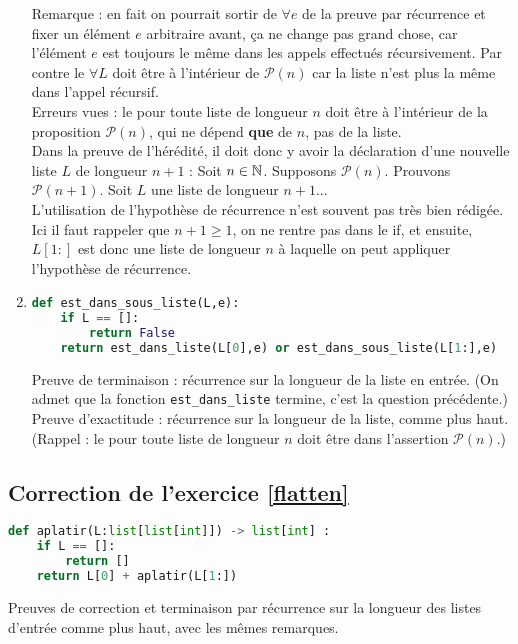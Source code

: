 \documentclass[11pt,a4paper]{article}
\begin{document}
\begin{enumerate}
Remarque : en fait on pourrait sortir de $\forall e$ de la preuve par récurrence et fixer un élément $e$ arbitraire avant, ça ne change pas grand chose, car l'élément $e$ est toujours le même dans les appels effectués récursivement. Par contre le $\forall L$ doit être à l'intérieur de $\mathcal P(n)$ car la liste n'est plus la même dans l'appel récursif.\\
Erreurs vues : le \og pour toute liste de longueur $n$\fg{} doit être à l'intérieur de la proposition $\mathcal P(n)$, qui ne dépend \textbf{que} de $n$, pas de la liste.\\
Dans la preuve de l'hérédité, il doit donc y avoir la déclaration d'une nouvelle liste $L$ de longueur $n+1$ : \og Soit $n\in \mathbb{N}$. Supposons $\mathcal P(n)$. Prouvons $\mathcal P(n+1)$. Soit $L$ une liste de longueur $n+1$...\fg\\
L'utilisation de l'hypothèse de récurrence n'est souvent pas très bien rédigée. Ici il faut rappeler que $n+1 \geq 1$, on ne rentre pas dans le \og if\fg, et ensuite,  $L[1:]$ est donc une liste de longueur $n$ à laquelle on peut appliquer l'hypothèse de récurrence.
\item 
\begin{lstlisting}[language=Python]
def est_dans_sous_liste(L,e):
	if L == []:
		return False
	return est_dans_liste(L[0],e) or est_dans_sous_liste(L[1:],e)
\end{lstlisting}
Preuve de terminaison : récurrence sur la longueur de la liste en entrée. (On admet que la fonction \verb+est_dans_liste+ termine, c'est la question précédente.)\\
Preuve d'exactitude : récurrence sur la longueur de la liste, comme plus haut. (Rappel : le \og pour toute liste de longueur $n$\fg{} doit être dans l'assertion $\mathcal P(n)$.)
\end{enumerate}




\subsection*{Correction de l'exercice \ref{flatten}}

\begin{lstlisting}[language=Python]
def aplatir(L:list[list[int]]) -> list[int] :
	if L == []:
		return []
	return L[0] + aplatir(L[1:])
\end{lstlisting}

Preuves de correction et terminaison par récurrence sur la longueur des listes d'entrée comme plus haut, avec les mêmes remarques.
\end{document}
